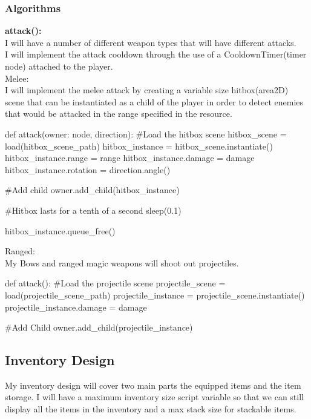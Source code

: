 \documentclass{article}
\begin{document}
        \subsubsection{Algorithms}
        \textbf{attack():}\\
        I will have a number of different weapon types that will have different attacks.\\
        I will implement the attack cooldown through the use of a CooldownTimer(timer node) attached to the player.\\
        Melee:\\
        I will implement the melee attack by creating a variable size hitbox(area2D) scene that can be instantiated as a child of the player in order to detect enemies that would be attacked in the range specified in the resource.\\
        \begin{python}
def attack(owner: node, direction):
   #Load the hitbox scene
   hitbox_scene = load(hitbox_scene_path)
   hitbox_instance = hitbox_scene.instantiate()
   hitbox_instance.range = range
   hitbox_instance.damage = damage
   hitbox_instance.rotation = direction.angle()

   #Add child
   owner.add_child(hitbox_instance)

   #Hitbox lasts for a tenth of a second
   sleep(0.1)
   
   hitbox_instance.queue_free()

        \end{python}
        Ranged:\\
        My Bows and ranged magic weapons will shoot out projectiles.
        \begin{python}
def attack():
   #Load the projectile scene
   projectile_scene = load(projectile_scene_path)
   projectile_instance = projectile_scene.instantiate()
   projectile_instance.damage = damage

   #Add Child
   owner.add_child(projectile_instance)
        \end{python}
        \subsection{Inventory Design}
        My inventory design will cover two main parts the equipped items and the item storage. I will have a maximum inventory size script variable so that we can still display all the items in the inventory and a max stack size for stackable items.\\
\end{document}

